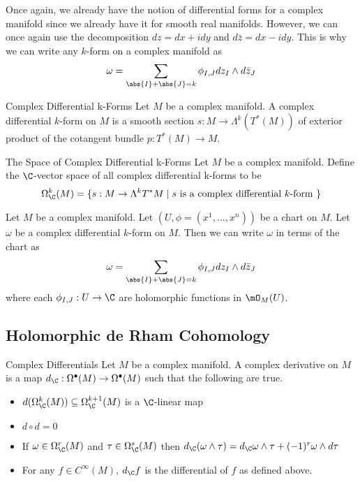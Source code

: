 \documentclass[a4paper]{article}
\begin{document}
Once again, we already have the notion of differential forms for a complex manifold since we already have it for smooth real manifolds. However, we can once again use the decomposition $dz=dx+idy$ and $d\bar{z}=dx-idy$. This is why we can write any $k$-form on a complex manifold as $$\omega=\sum_{\abs{I}+\abs{J}=k}\phi_{I,J}dz_I\wedge d\bar{z}_J$$

\begin{defn}{Complex Differential k-Forms}{} Let $M$ be a complex manifold. A complex differential $k$-form on $M$ is a smooth section $s:M\to\Lambda^k(T^\ast(M))$ of exterior product of the cotangent bundle $p:T^\ast(M)\to M$. 
\end{defn}

\begin{defn}{The Space of Complex Differential k-Forms}{} Let $M$ be a complex manifold. Define the $\C$-vector space of all complex differential k-forms to be $$\Omega_\C^k(M)=\{s:M\to\Lambda^kT^\ast M\;|\;s\text{ is a complex differential }k\text{-form }\}$$
\end{defn}

\begin{prp}{}{} Let $M$ be a complex manifold. Let $(U,\phi=(x^1,\dots,x^n))$ be a chart on $M$. Let $\omega$ be a complex differential $k$-form on $M$. Then we can write $\omega$ in terms of the chart as $$\omega=\sum_{\abs{I}+\abs{J}=k}\phi_{I,J}dz_I\wedge d\bar{z}_J$$ where each $\phi_{I,J}:U\to\C$ are holomorphic functions in $\mO_M(U)$. 
\end{prp}

\subsection{Holomorphic de Rham Cohomology}
\begin{defn}{Complex Differentials}{} Let $M$ be a complex manifold. A complex derivative on $M$ is a map $d_\C:\Omega^\bullet(M)\to\Omega^\bullet(M)$ such that the following are true. 
\begin{itemize}
\item $d(\Omega_\C^k(M))\subseteq\Omega_\C^{k+1}(M)$ is a $\C$-linear map
\item $d\circ d=0$
\item If $\omega\in\Omega_\C^r(M)$ and $\tau\in\Omega_\C^s(M)$ then $d_\C(\omega\wedge\tau)=d_\C\omega\wedge\tau+(-1)^r\omega\wedge d\tau$
\item For any $f\in C^\infty(M)$, $d_\C f$ is the differential of $f$ as defined above. 
\end{itemize}
\end{defn}
\end{document}

